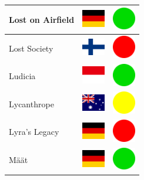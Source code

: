 \documentclass[12pt, a4paper, twoside]{report}
\begin{document}
\begin{center}
\begin{longtable}{|p{5cm}|p{2cm}|p{2cm}|}
Lost on Airfield & \includegraphics[width=1cm]{4x3/de} & \includegraphics[width=1cm]{likes/y} \\ \hline
Lost Society & \includegraphics[width=1cm]{4x3/fi} & \includegraphics[width=1cm]{likes/n} \\ \hline
Ludicia & \includegraphics[width=1cm]{4x3/id} & \includegraphics[width=1cm]{likes/y} \\ \hline
Lycanthrope & \includegraphics[width=1cm]{4x3/au} & \includegraphics[width=1cm]{likes/m} \\ \hline
Lyra's Legacy & \includegraphics[width=1cm]{4x3/de} & \includegraphics[width=1cm]{likes/n} \\ \hline
Määt & \includegraphics[width=1cm]{4x3/de} & \includegraphics[width=1cm]{likes/y} \\ \hline

\end{longtable}
\end{center}
\end{document}
